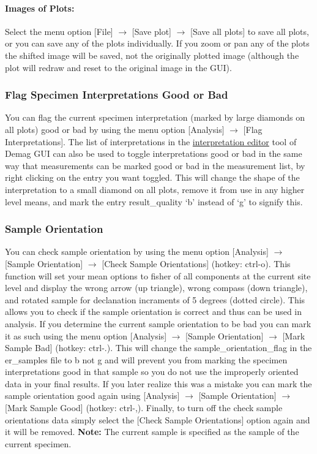 \documentclass[11pt]{book}
\begin{document}
{{\paragraph{Images of Plots:}\label{images-of-plots} Select the menu option [File] $\rightarrow$ [Save plot] $\rightarrow$ [Save all plots] to save all plots, or you can save any of the plots individually. If you zoom or pan any of the plots the shifted image will be saved, not the originally plotted image (although the plot will redraw and reset to the original image in the GUI).

\subsubsection{Flag Specimen Interpretations Good or Bad}\label{flag-spec-interps}

You can flag the current specimen interpretation (marked by large diamonds on all plots) good or bad by using the menu option [Analysis] $\rightarrow$ [Flag Interpretations]. The list of interpretations in the \hyperref[interpretation-editor]{interpretation editor} tool of Demag GUI can also be used to toggle interpretations good or bad in the same way that measurements can be marked good or bad in the measurement list, by right clicking on the entry you want toggled. This will change the shape of the interpretation to a small diamond on all plots, remove it from use in any higher level means, and mark the entry result\_quality `b' instead of `g' to signify this.

\subsubsection{Sample Orientation}\label{sample-orient}

You can check sample orientation by using the menu option [Analysis] $\rightarrow$ [Sample Orientation] $\rightarrow$ [Check Sample Orientations] (hotkey: ctrl-o). This function will set your mean options to fisher of all components at the current site level and display the wrong arrow (up triangle), wrong compass (down triangle), and rotated sample for declanation incraments of 5 degrees (dotted circle). This allows you to check if the sample orientation is correct and thus can be used in analysis. If you determine the current sample orientation to be bad you can mark it as such using the menu option [Analysis] $\rightarrow$ [Sample Orientation] $\rightarrow$ [Mark Sample Bad] (hotkey: ctrl-.). This will change the sample_orientation_flag in the er_samples file to b not g and will prevent you from marking the specimen interpretations good in that sample so you do not use the improperly oriented data in your final results. If you later realize this was a mistake you can mark the sample orientation good again using [Analysis] $\rightarrow$ [Sample Orientation] $\rightarrow$ [Mark Sample Good] (hotkey: ctrl-,). Finally, to turn off the check sample orientations data simply select the [Check Sample Orientations] option again and it will be removed. \textbf{Note:} The current sample is specified as the sample of the current specimen.

}}
\end{document}
